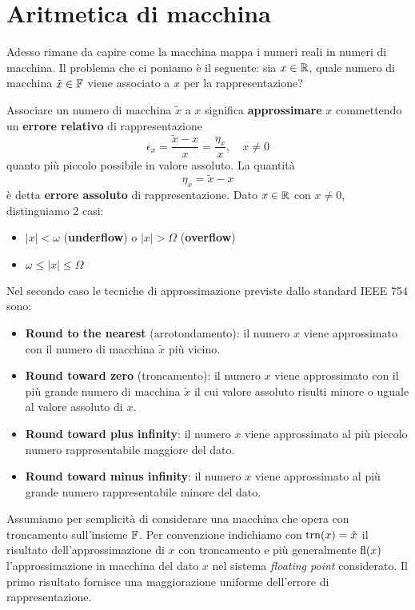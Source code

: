 \section{Aritmetica di macchina}
Adesso rimane da capire come la macchina mappa i numeri reali in numeri di macchina. Il problema che ci
poniamo è il seguente: sia $x \in \mathbb{R}$, quale numero di macchina $\tilde{x} \in \mathbb{F}$ viene associato a $x$
per la rappresentazione?

Associare un numero di macchina $\tilde{x}$ a $x$ significa \textbf{approssimare} $x$ commettendo un
\textbf{errore relativo} di rappresentazione
\[ \epsilon_x = \frac{\tilde{x} - x}{x} = \frac{\eta_x}{x}, \quad x \neq 0 \]
quanto più piccolo possibile in valore assoluto. La quantità
\[ \eta_x = \tilde{x} - x \]
è detta \textbf{errore assoluto} di rappresentazione. Dato $x \in \mathbb{R}$ con $x \neq 0$, distinguiamo 2 casi:
\begin{itemize}
	\item $|x| < \omega$ (\textbf{underflow}) o $|x| > \Omega$ (\textbf{overflow})
	\item $\omega \leq |x| \leq \Omega$
\end{itemize}
Nel secondo caso le tecniche di approssimazione previste dallo standard IEEE 754 sono:
\begin{itemize}
	\item \textbf{Round to the nearest} (arrotondamento): il numero $x$ viene approssimato con il numero di
	      macchina $\tilde{x}$ più vicino.
	\item \textbf{Round toward zero} (troncamento): il numero $x$ viene approssimato con il più grande numero
	      di macchina $\tilde{x}$ il cui valore assoluto risulti minore o uguale al valore assoluto di $x$.
	\item \textbf{Round toward plus infinity}: il numero $x$ viene approssimato al più piccolo numero
	      rappresentabile maggiore del dato.
	\item \textbf{Round toward minus infinity}: il numero $x$ viene approssimato al più grande numero
	      rappresentabile minore del dato.
\end{itemize}
Assumiamo per semplicità di considerare una macchina che opera con troncamento sull'insieme $\mathbb{F}$. Per
convenzione indichiamo con $\operatorname{trn}(x) = \tilde{x}$ il risultato dell'approssimazione di $x$ con troncamento e
più generalmente $\operatorname{fl}(x)$ l'approssimazione in macchina del dato $x$ nel sistema \emph{floating point}
considerato. Il primo risultato fornisce una maggiorazione uniforme dell'errore di rappresentazione.


